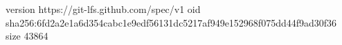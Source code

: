 version https://git-lfs.github.com/spec/v1
oid sha256:6fd2a2e1a6d354cabc1e9edf56131dc5217af949e152968f075dd44f9ad30f36
size 43864

